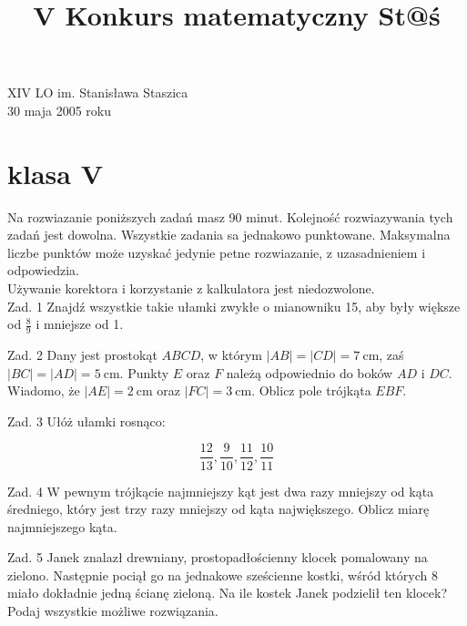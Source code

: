\documentclass[10pt]{article}
\title{V Konkurs matematyczny St@ś }
\author{}
\date{}
\begin{document}
\maketitle
XIV LO im. Stanisława Staszica\\
30 maja 2005 roku

\section*{klasa V}
Na rozwiazanie poniższych zadań masz 90 minut. Kolejność rozwiazywania tych zadań jest dowolna. Wszystkie zadania sa jednakowo punktowane. Maksymalna liczbe punktów może uzyskać jedynie petne rozwiazanie, z uzasadnieniem i odpowiedzia.\\
Używanie korektora i korzystanie z kalkulatora jest niedozwolone.\\
Zad. 1 Znajdź wszystkie takie ułamki zwykłe o mianowniku 15, aby były większe od \(\frac{8}{9}\) i mniejsze od 1.

Zad. 2 Dany jest prostokąt \(A B C D\), w którym \(|A B|=|C D|=7 \mathrm{~cm}\), zaś \(|B C|=|A D|=5 \mathrm{~cm}\). Punkty \(E\) oraz \(F\) należą odpowiednio do boków \(A D\) i \(D C\). Wiadomo, że \(|A E|=2 \mathrm{~cm}\) oraz \(|F C|=3 \mathrm{~cm}\). Oblicz pole trójkąta \(E B F\).

Zad. 3 Ułóż ułamki rosnąco:

\[
\frac{12}{13}, \frac{9}{10}, \frac{11}{12}, \frac{10}{11}
\]

Zad. 4 W pewnym trójkącie najmniejszy kąt jest dwa razy mniejszy od kąta średniego, który jest trzy razy mniejszy od kąta największego. Oblicz miarę najmniejszego kąta.

Zad. 5 Janek znalazł drewniany, prostopadłościenny klocek pomalowany na zielono. Następnie pociął go na jednakowe sześcienne kostki, wśród których 8 miało dokładnie jedną ścianę zieloną. Na ile kostek Janek podzielił ten klocek? Podaj wszystkie możliwe rozwiązania.
\end{document}

